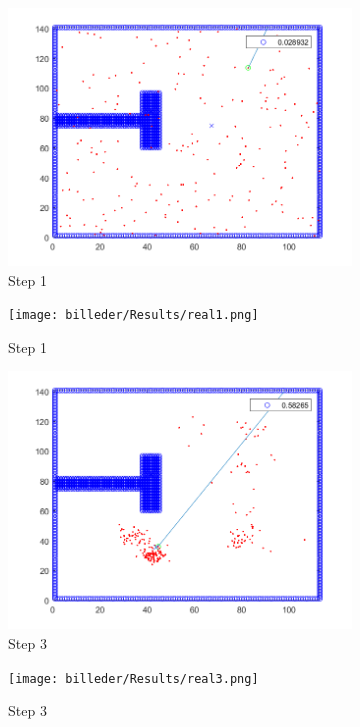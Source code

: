 \begin{figure}[H]
\centering
\begin{subfigure}{.5\textwidth}
  \centering
  \includegraphics[width=.8\linewidth]{billeder/Results/1.png}
  \caption{Step 1}
  \label{ResultDriveFig1:sub1}
\end{subfigure}%
\begin{subfigure}{.5\textwidth}
  \centering
  \texttt{[image: billeder/Results/real1.png]}
  \caption{Step 1}
  \label{ResultDriveFig1:sub2}
\end{subfigure}
\begin{subfigure}{.5\textwidth}
  \centering
  \includegraphics[width=.8\linewidth]{billeder/Results/3.png}
  \caption{Step 3}
  \label{ResultDriveFig1:sub3}
\end{subfigure}%
\begin{subfigure}{.5\textwidth}
  \centering
  \texttt{[image: billeder/Results/real3.png]}
  \caption{Step 3}
  \label{ResultDriveFig1:sub4}
\end{subfigure}
\begin{subfigure}{.5\textwidth}

\end{subfigure}
\end{figure}
